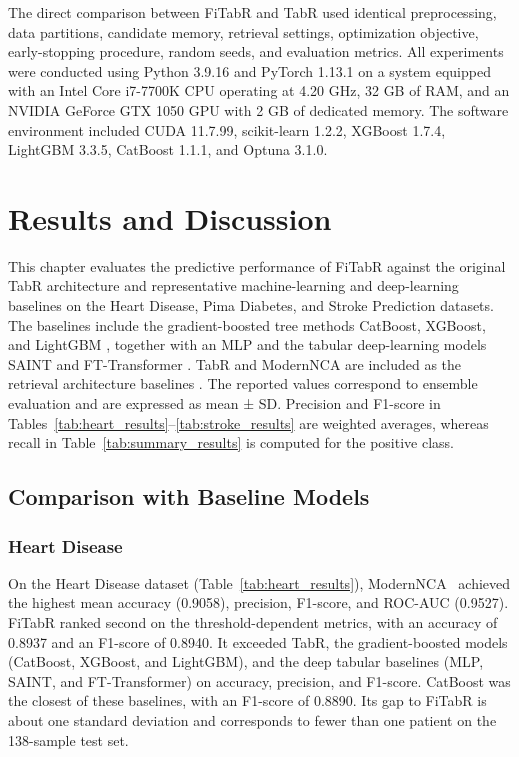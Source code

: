\documentclass[11pt,a4paper,oneside, openany, reqno, chapter, nokorean]{oblivoir}
\theoremstyle{definition}
\theoremstyle{remark}
\numberwithin{equation}{chapter}
\theoremstyle{definition}
\theoremstyle{remark}
\theoremstyle{definition}
\begin{document}
The direct comparison between FiTabR and TabR used identical preprocessing, data partitions, candidate memory, retrieval settings, optimization objective, early-stopping procedure, random seeds, and evaluation metrics. 
All experiments were conducted using Python 3.9.16 and PyTorch 1.13.1 on a system equipped with an Intel Core i7-7700K CPU operating at 4.20 GHz, 32 GB of RAM, and an NVIDIA GeForce GTX 1050 GPU with 2 GB of dedicated memory. The software environment included CUDA 11.7.99, scikit-learn 1.2.2, XGBoost 1.7.4, LightGBM 3.3.5, CatBoost 1.1.1, and Optuna 3.1.0.

\chapter{Results and Discussion}
\label{chap:results}

This chapter evaluates the predictive performance of FiTabR against the
original TabR architecture and representative machine-learning and
deep-learning baselines on the Heart Disease, Pima Diabetes, and Stroke
Prediction datasets. The baselines include the gradient-boosted tree methods CatBoost, XGBoost,
and LightGBM \cite{prokhorenkova2018catboost,chen2016xgboost,ke2017lightgbm},
together with an MLP and the tabular deep-learning models SAINT and
FT-Transformer \cite{somepalli2021saint,gorishniy2021revisiting}. TabR and ModernNCA
are included as the retrieval architecture baselines
\cite{gorishniy2024tabr,ye2025modernnca}. The reported values correspond to ensemble
evaluation and are expressed as mean ± SD. Precision and F1-score in
Tables~\ref{tab:heart_results}--\ref{tab:stroke_results} are weighted
averages, whereas recall in Table~\ref{tab:summary_results} is computed for
the positive class.

\section{Comparison with Baseline Models}
\label{sec:cummulative_results}

\subsection{Heart Disease}
\label{sec:heart_results}

On the Heart Disease dataset (Table~\ref{tab:heart_results}), ModernNCA~\cite{ye2025modernnca}
achieved the highest mean accuracy (0.9058), precision, F1-score, and ROC-AUC
(0.9527). FiTabR ranked second on the threshold-dependent metrics, with an
accuracy of 0.8937 and an F1-score of 0.8940. It exceeded TabR, the
gradient-boosted models (CatBoost, XGBoost, and LightGBM), and the deep tabular
baselines (MLP, SAINT, and FT-Transformer) on accuracy, precision, and
F1-score. CatBoost was the closest of these baselines, with an F1-score of
0.8890. Its gap to FiTabR is about one standard deviation and corresponds to
fewer than one patient on the 138-sample test set.
\end{document}
